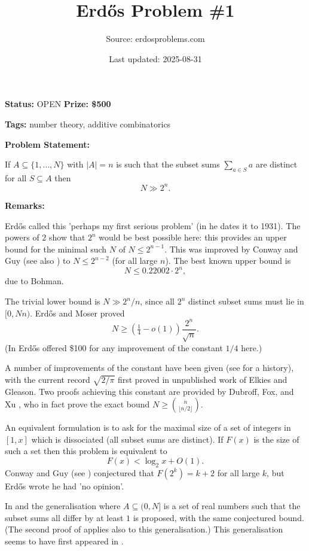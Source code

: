\documentclass{article}
\title{Erd\H{o}s Problem \#1}
\date{Last updated: 2025-08-31}
\author{Source: erdosproblems.com}
\begin{document}
\maketitle

\noindent\textbf{Status:} OPEN \quad \textbf{Prize: \$500}

\noindent\textbf{Tags:} number theory, additive combinatorics

\medskip
\noindent\textbf{Problem Statement:}

If $A\subseteq \{1,\ldots,N\}$ with $\lvert A\rvert=n$ is such that the subset sums $\sum_{a\in S}a$ are distinct for all $S\subseteq A$ then\[N \gg 2^{n}.\]

\bigskip
\noindent\textbf{Remarks:}

Erd\H{o}s called this 'perhaps my first serious problem' (in \cite{Er98} he dates it to 1931). The powers of $2$ show that $2^n$ would be best possible here: this provides an upper bound for the minimal such $N$ of $N\leq 2^{n-1}$. This was improved by Conway and Guy \cite{CoGu68} (see also \cite{Gu82}) to $N\leq 2^{n-2}$ (for all large $n$). The best known upper bound is\[N\leq 0.22002\cdot 2^n,\]due to Bohman.

The trivial lower bound is $N \gg 2^{n}/n$, since all $2^n$ distinct subset sums must lie in $[0,Nn)$. Erd\H{o}s and Moser \cite{Er56} proved\[ N\geq (\tfrac{1}{4}-o(1))\frac{2^n}{\sqrt{n}}.\](In \cite{Er85c} Erd\H{o}s offered \$100 for any improvement of the constant $1/4$ here.)

A number of improvements of the constant have been given (see \cite{St23} for a history), with the current record $\sqrt{2/\pi}$ first proved in unpublished work of Elkies and Gleason. Two proofs achieving this constant are provided by Dubroff, Fox, and Xu \cite{DFX21}, who in fact prove the exact bound $N\geq \binom{n}{\lfloor n/2\rfloor}$.

An equivalent formulation is to ask for the maximal size of a set of integers in $[1,x]$ which is dissociated (all subset sums are distinct). If $F(x)$ is the size of such a set then this problem is equivalent to\[F(x) <\log_2x+O(1).\]Conway and Guy (see \cite{Gu82}) conjectured that $F(2^k)=k+2$ for all large $k$, but Erd\H{o}s \cite{Er80} wrote he had 'no opinion'.

In \cite{Er73} and \cite{ErGr80} the generalisation where $A\subseteq (0,N]$ is a set of real numbers such that the subset sums all differ by at least $1$ is proposed, with the same conjectured bound. (The second proof of \cite{DFX21} applies also to this generalisation.) This generalisation seems to have first appeared in \cite{Gr71}.
\end{document}
